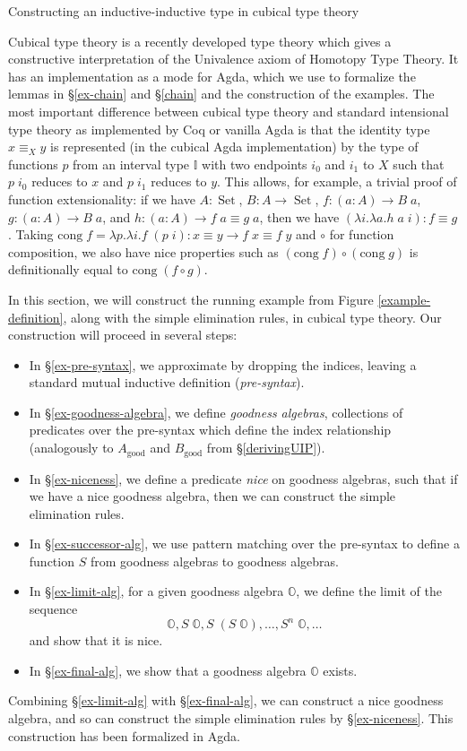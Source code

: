 \documentclass[acmsmall,review]{acmart}\settopmatter{printfolios=true,printccs=false,printacmref=false}
\DeclareMathOperator{\USet}{Set}
\newcommand{\good}[1]{{#1}_\text{good}}
\newcommand{\Id}[2]{{#1}\equiv{#2}}
\newcommand{\IdA}[3]{{#1}\equiv_{#3}{#2}}
\newcommand{\I}{\mathbb{I}}
\newcommand{\bbO}{\mathbb{O}}
\begin{document}
\begin{section}{Constructing an inductive-inductive type in cubical type theory}\label{example-construct-cubical}

Cubical type theory \citep{cubicaltt_ifcolog} is a recently developed type theory which gives a constructive interpretation of the Univalence axiom of Homotopy Type Theory. It has an implementation as a mode for Agda, which we use to formalize the lemmas in \S\ref{ex-chain} and \S\ref{chain} and the construction of the examples. The most important difference between cubical type theory and standard intensional type theory as implemented by Coq or vanilla Agda is that the identity type $\IdA{x}{y}{X}$ is represented (in the cubical Agda implementation) by the type of functions $p$ from an interval type $\I$ with two endpoints $i_0$ and $i_1$ to $X$ such that $p\;i_0$ reduces to $x$ and $p\;i_1$ reduces to $y$. This allows, for example, a trivial proof of function extensionality: if we have $A : \USet$, $B : A\to \USet$, $f : (a : A) \to B\;a$, $g : (a : A)\to B\;a$, and $h : (a : A) \to \Id{f\;a}{g\;a}$, then we have $(\lambda i.\lambda a.h\;a\;i) : \Id{f}{g}$. Taking $\text{cong}\; f = \lambda p. \lambda i. f\; (p\;i) : \Id{x}{y} \to \Id{f\;x}{f\;y}$ and $\circ$ for function composition, we also have nice properties such as $(\text{cong}\; f) \circ (\text{cong}\; g)$ is definitionally equal to $\text{cong}\; (f \circ g)$.

In this section, we will construct the running example from Figure \ref{example-definition}, along with the simple elimination rules, in cubical type theory. Our construction will proceed in several steps:
\begin{itemize}
    \item In \S\ref{ex-pre-syntax}, we approximate by dropping the indices, leaving a standard mutual inductive definition (\emph{pre-syntax}).
    \item In \S\ref{ex-goodness-algebra}, we define \emph{goodness algebras}, collections of predicates over the pre-syntax which define the index relationship (analogously to $\good{A}$ and $\good{B}$ from \S\ref{derivingUIP}).
    \item In \S\ref{ex-niceness}, we define a predicate \emph{nice} on goodness algebras, such that if we have a nice goodness algebra, then we can construct the simple elimination rules.
    \item In \S\ref{ex-successor-alg}, we use pattern matching over the pre-syntax to define a function $S$ from goodness algebras to goodness algebras.
    \item In \S\ref{ex-limit-alg}, for a given goodness algebra $\bbO$, we define the limit of the sequence \[\bbO, S\;\bbO, S\;(S\;\bbO), \dots, S^n\;\bbO,\dots\] and show that it is nice.
    \item In \S\ref{ex-final-alg}, we show that a goodness algebra $\bbO$ exists.
\end{itemize}
Combining \S\ref{ex-limit-alg} with \S\ref{ex-final-alg}, we can construct a nice goodness algebra, and so can construct the simple elimination rules by \S\ref{ex-niceness}. This construction has been formalized in Agda.


\end{section}
\end{document}
